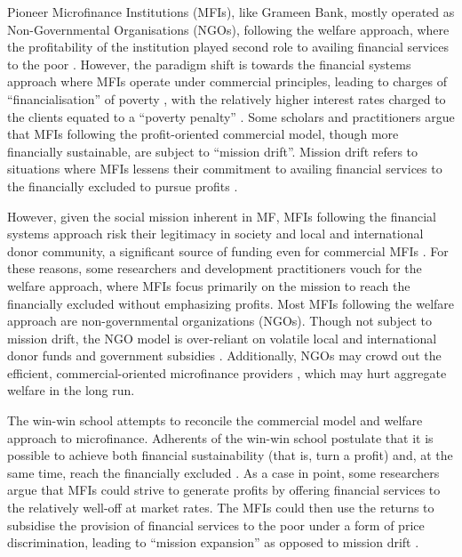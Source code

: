 \documentclass[a4paper,nobind]{templates/ociamthesis}
\begin{document}
Pioneer Microfinance Institutions (MFIs), like Grameen Bank, mostly operated as Non-Governmental Organisations (NGOs), following the welfare approach, where the profitability of the institution played second role to availing financial services to the poor \autocite{chahine2010social,d2017ngos}. However, the paradigm shift is towards the financial systems approach where MFIs operate under commercial principles, leading to charges of ``financialisation'' of poverty \autocite{mader2015financialization}, with the relatively higher interest rates charged to the clients equated to a ``poverty penalty'' \autocite{chen2017microfinance}. Some scholars and practitioners argue that MFIs following the profit-oriented commercial model, though more financially sustainable, are subject to ``mission drift''. Mission drift refers to situations where MFIs lessens their commitment to availing financial services to the financially excluded to pursue profits \autocite{jia2016commercialization,mia2017mission}.

However, given the social mission inherent in MF, MFIs following the financial systems approach risk their legitimacy in society and local and international donor community, a significant source of funding even for commercial MFIs \autocite{nason2018behavioral}. For these reasons, some researchers and development practitioners vouch for the welfare approach, where MFIs focus primarily on the mission to reach the financially excluded without emphasizing profits. Most MFIs following the welfare approach are non-governmental organizations (NGOs). Though not subject to mission drift, the NGO model is over-reliant on volatile local and international donor funds and government subsidies \autocite{garmaise2013cheap,d2017aid}. Additionally, NGOs may crowd out the efficient, commercial-oriented microfinance providers \autocite{kota2007}, which may hurt aggregate welfare in the long run.

The win-win school attempts to reconcile the commercial model and welfare approach to microfinance. Adherents of the win-win school postulate that it is possible to achieve both financial sustainability (that is, turn a profit) and, at the same time, reach the financially excluded \autocite{kodongo2013individual}. As a case in point, some researchers argue that MFIs could strive to generate profits by offering financial services to the relatively well-off at market rates. The MFIs could then use the returns to subsidise the provision of financial services to the poor under a form of price discrimination, leading to ``mission expansion'' as opposed to mission drift \autocite{mersland2010microfinance}.
\end{document}
